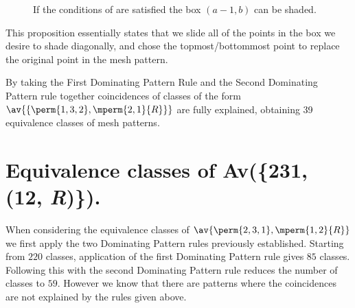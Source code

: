 \begin{figure}[ht]
\centering
{}
    \caption{If the conditions of  are satisfied the box
    \((a-1,b)\) can be shaded.}
\end{figure}

This proposition essentially states that we slide all of the points in the box we desire
to shade diagonally, and chose the topmost/bottommost point to replace the original
point in the mesh pattern.

By taking the First Dominating Pattern Rule and the Second Dominating Pattern
rule together coincidences of classes of the form \(\av{\{\perm{1,3,2},\mperm{2,1}{R}\}}\)
are fully explained, obtaining 39 equivalence classes of mesh patterns.

\section{Equivalence classes of Av(\{231, (12, \textit{R})\}).}
When considering the equivalence classes of \(\av{\perm{2,3,1},\mperm{1,2}{R}}\)
we first apply the two Dominating Pattern rules previously established.
Starting from \(220\) classes, application of the first Dominating Pattern rule
gives \(85\) classes. Following this with the second Dominating Pattern rule
reduces the number of classes to \(59\). However we know that there are patterns
where the coincidences are not explained by the rules given above.

